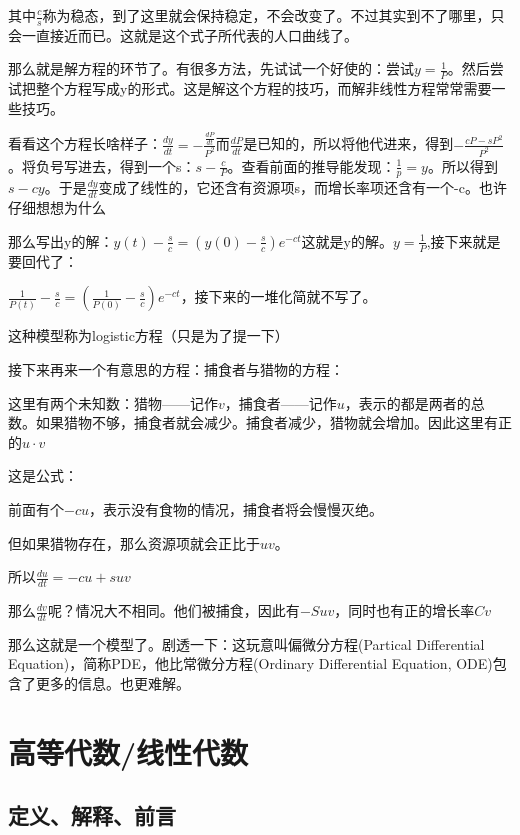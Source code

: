 \documentclass[UTF8]{ctexbook}
\begin{document}
{{{{  其中$\frac{c}{s}$称为稳态，到了这里就会保持稳定，不会改变了。不过其实到不了哪里，只会一直接近而已。这就是这个式子所代表的人口曲线了。

  那么就是解方程的环节了。有很多方法，先试试一个好使的：尝试$y = \frac{1}{P}$。然后尝试把整个方程写成y的形式。这是解这个方程的技巧，而解非线性方程常常需要一些技巧。

  看看这个方程长啥样子：$\frac{dy}{dt} = -\frac{\frac{dP}{dt}}{P^2}$而$\frac{dP}{dt}$是已知的，所以将他代进来，得到$-\frac{cP - sP^2}{P^2}$。将负号写进去，得到一个s：$s - \frac{c}{P}$。查看前面的推导能发现：$\frac{1}{p} = y$。所以得到$s - cy$。于是$\frac{dy}{dt}$变成了线性的，它还含有资源项s，而增长率项还含有一个-c。也许仔细想想为什么

  那么写出y的解：$y(t) - \frac{s}{c} = (y(0) - \frac{s}{c})e^{-ct}$这就是y的解。$y = \frac{1}{P}$,接下来就是要回代了：

  $\frac{1}{P(t)} - \frac{s}{c} = (\frac{1}{P(0)} - \frac{s}{c})e^{-ct}$，接下来的一堆化简就不写了。

  这种模型称为logistic方程（只是为了提一下）

  接下来再来一个有意思的方程：捕食者与猎物的方程：

  这里有两个未知数：猎物——记作$v$，捕食者——记作$u$，表示的都是两者的总数。如果猎物不够，捕食者就会减少。捕食者减少，猎物就会增加。因此这里有正的$u \cdot v$

  这是公式：

  前面有个$-cu$，表示没有食物的情况，捕食者将会慢慢灭绝。

  但如果猎物存在，那么资源项就会正比于$uv$。

  所以$\frac{du}{dt} = -cu + suv$

  那么$\frac{dv}{dt}$呢？情况大不相同。他们被捕食，因此有$-Suv$，同时也有正的增长率$Cv$

  那么这就是一个模型了。剧透一下：这玩意叫偏微分方程(Partical Differential Equation)，简称PDE，他比常微分方程(Ordinary Differential Equation, ODE)包含了更多的信息。也更难解。

}%

}%

}%

\section{高等代数/线性代数}{
\subsection{定义、解释、前言}{
}}}
\end{document}
